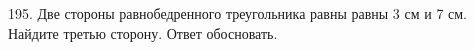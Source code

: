 195. Две стороны равнобедренного треугольника равны равны 3 см и 7 см. Найдите третью сторону. Ответ обосновать.\\
